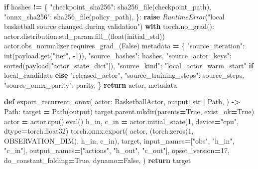 \documentclass[
  chinese,
  11pt,
  letterpaper,
]{article}
\newenvironment{Shaded}{\begin{snugshade}}{\end{snugshade}}
\newcommand{\BuiltInTok}[1]{#1}
\newcommand{\ControlFlowTok}[1]{\textcolor[rgb]{0.13,0.29,0.53}{\textbf{#1}}}
\newcommand{\DecValTok}[1]{\textcolor[rgb]{0.00,0.00,0.81}{#1}}
\newcommand{\KeywordTok}[1]{\textcolor[rgb]{0.13,0.29,0.53}{\textbf{#1}}}
\newcommand{\NormalTok}[1]{#1}
\newcommand{\OperatorTok}[1]{\textcolor[rgb]{0.81,0.36,0.00}{\textbf{#1}}}
\newcommand{\PreprocessorTok}[1]{\textcolor[rgb]{0.56,0.35,0.01}{\textit{#1}}}
\newcommand{\StringTok}[1]{\textcolor[rgb]{0.31,0.60,0.02}{#1}}
\newcommand{\VariableTok}[1]{\textcolor[rgb]{0.00,0.00,0.00}{#1}}
\renewenvironment{Shaded}{\par\smallskip}{\par\smallskip}
\begin{document}
\begin{Shaded}
\begin{Highlighting}[]
        \ControlFlowTok{if}\NormalTok{ hashes }\OperatorTok{!=}\NormalTok{ \{}
            \StringTok{"checkpoint\_sha256"}\NormalTok{: sha256\_file(checkpoint\_path),}
            \StringTok{"onnx\_sha256"}\NormalTok{: sha256\_file(policy\_path),}
\NormalTok{        \}:}
            \ControlFlowTok{raise} \PreprocessorTok{RuntimeError}\NormalTok{(}\StringTok{"local basketball source changed during validation"}\NormalTok{)}
    \ControlFlowTok{with}\NormalTok{ torch.no\_grad():}
\NormalTok{        actor.distribution.std\_param.fill\_(}\BuiltInTok{float}\NormalTok{(initial\_std))}
\NormalTok{    actor.obs\_normalizer.requires\_grad\_(}\VariableTok{False}\NormalTok{)}
\NormalTok{    metadata }\OperatorTok{=}\NormalTok{ \{}
        \StringTok{"source\_iteration"}\NormalTok{: }\BuiltInTok{int}\NormalTok{(payload.get(}\StringTok{"iter"}\NormalTok{, }\OperatorTok{{-}}\DecValTok{1}\NormalTok{)),}
        \StringTok{"source\_hashes"}\NormalTok{: hashes,}
        \StringTok{"source\_actor\_keys"}\NormalTok{: }\BuiltInTok{sorted}\NormalTok{(payload[}\StringTok{"actor\_state\_dict"}\NormalTok{]),}
        \StringTok{"source\_kind"}\NormalTok{: }\StringTok{"local\_actor\_warm\_start"} \ControlFlowTok{if}\NormalTok{ local\_candidate }\ControlFlowTok{else} \StringTok{"released\_actor"}\NormalTok{,}
        \StringTok{"source\_training\_steps"}\NormalTok{: source\_steps,}
        \StringTok{"source\_onnx\_parity"}\NormalTok{: parity,}
\NormalTok{    \}}
    \ControlFlowTok{return}\NormalTok{ actor, metadata}


\KeywordTok{def}\NormalTok{ export\_recurrent\_onnx(}
\NormalTok{    actor: BasketballActor,}
\NormalTok{    output: }\BuiltInTok{str} \OperatorTok{|}\NormalTok{ Path,}
\NormalTok{) }\OperatorTok{{-}\textgreater{}}\NormalTok{ Path:}
\NormalTok{    target }\OperatorTok{=}\NormalTok{ Path(output)}
\NormalTok{    target.parent.mkdir(parents}\OperatorTok{=}\VariableTok{True}\NormalTok{, exist\_ok}\OperatorTok{=}\VariableTok{True}\NormalTok{)}
\NormalTok{    actor }\OperatorTok{=}\NormalTok{ actor.cpu().}\BuiltInTok{eval}\NormalTok{()}
\NormalTok{    h\_in, c\_in }\OperatorTok{=}\NormalTok{ actor.initial\_state(}\DecValTok{1}\NormalTok{, device}\OperatorTok{=}\StringTok{"cpu"}\NormalTok{, dtype}\OperatorTok{=}\NormalTok{torch.float32)}
\NormalTok{    torch.onnx.export(}
\NormalTok{        actor,}
\NormalTok{        (torch.zeros(}\DecValTok{1}\NormalTok{, OBSERVATION\_DIM), h\_in, c\_in),}
\NormalTok{        target,}
\NormalTok{        input\_names}\OperatorTok{=}\NormalTok{[}\StringTok{"obs"}\NormalTok{, }\StringTok{"h\_in"}\NormalTok{, }\StringTok{"c\_in"}\NormalTok{],}
\NormalTok{        output\_names}\OperatorTok{=}\NormalTok{[}\StringTok{"actions"}\NormalTok{, }\StringTok{"h\_out"}\NormalTok{, }\StringTok{"c\_out"}\NormalTok{],}
\NormalTok{        opset\_version}\OperatorTok{=}\DecValTok{17}\NormalTok{,}
\NormalTok{        do\_constant\_folding}\OperatorTok{=}\VariableTok{True}\NormalTok{,}
\NormalTok{        dynamo}\OperatorTok{=}\VariableTok{False}\NormalTok{,}
\NormalTok{    )}
    \ControlFlowTok{return}\NormalTok{ target}



\end{Highlighting}
\end{Shaded}
\end{document}
